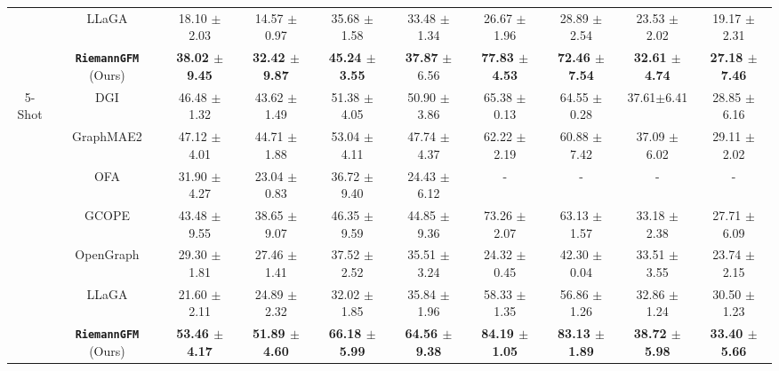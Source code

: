 \begin{table*}[ht]
\begin{tabular}{c  c |cc cc cc cc}
    & LLaGA \cite{icml24llaga}
    & 18.10 {\scriptsize$\pm$2.03} & 14.57 {\scriptsize$\pm$0.97} & 35.68 {\scriptsize$\pm$1.58} & 33.48 {\scriptsize$\pm$1.34} & 26.67 {\scriptsize$\pm$1.96} & 28.89 {\scriptsize$\pm$2.54} & 23.53 {\scriptsize$\pm$2.02} & 19.17 {\scriptsize$\pm$2.31} \\
    & \textbf{\texttt{RiemannGFM}}  (Ours)
    & \textbf{38.02 {\scriptsize$\pm$9.45}} & \textbf{32.42 {\scriptsize$\pm$9.87}} & \textbf{45.24 {\scriptsize$\pm$3.55} }& 
    \textbf{37.87} {\scriptsize$\pm$6.56} & \textbf{77.83 {\scriptsize$\pm$4.53}} & \textbf{72.46 {\scriptsize$\pm$7.54}} & \textbf{32.61 {\scriptsize$\pm$4.74}} & \textbf{27.18 {\scriptsize$\pm$7.46}} \\
    \hline
    \multirow{7}{*}{5-Shot}
    & DGI \cite{iclr19dgi}
    & 46.48 {\scriptsize$\pm$1.32} & 43.62 {\scriptsize$\pm$1.49} & 51.38 {\scriptsize$\pm$4.05} & 50.90 {\scriptsize$\pm$3.86} & 65.38 {\scriptsize$\pm$0.13} & 64.55 {\scriptsize$\pm$0.28} & 37.61{\scriptsize$\pm$6.41} & 28.85 {\scriptsize$\pm$6.16} \\
    & GraphMAE2 \cite{www23graphmae2}
    & 47.12 {\scriptsize$\pm$4.01} & 44.71 {\scriptsize$\pm$1.88} & 53.04 {\scriptsize$\pm$4.11} & 47.74 {\scriptsize$\pm$4.37} & 62.22 {\scriptsize$\pm$2.19} & 60.88 {\scriptsize$\pm$7.42} & 37.09 {\scriptsize$\pm$6.02} & 29.11 {\scriptsize$\pm$2.02} \\
    & OFA \cite{iclr24ofa}
    & 31.90 {\scriptsize$\pm$4.27} & 23.04 {\scriptsize$\pm$0.83} & 36.72 {\scriptsize$\pm$9.40} & 24.43 {\scriptsize$\pm$6.12} 
    &- &- & -& -\\
    & GCOPE \cite{kdd24gcope}
    & 43.48 {\scriptsize$\pm$9.55} & 38.65 {\scriptsize$\pm$9.07} & 46.35 {\scriptsize$\pm$9.59} & 44.85 {\scriptsize$\pm$9.36} & 73.26 {\scriptsize$\pm$2.07} & 63.13 {\scriptsize$\pm$1.57} & 33.18 {\scriptsize$\pm$2.38} & 27.71 {\scriptsize$\pm$6.09} \\
    & OpenGraph \cite{zhao2024graphany}
    & 29.30 {\scriptsize$\pm$1.81} & 27.46 {\scriptsize$\pm$1.41} & 37.52 {\scriptsize$\pm$2.52} & 35.51 {\scriptsize$\pm$3.24} & 24.32 {\scriptsize$\pm$0.45} & 42.30 {\scriptsize$\pm$0.04} & 33.51 {\scriptsize$\pm$3.55} & 23.74 {\scriptsize$\pm$2.15} \\
    & LLaGA \cite{icml24llaga}
    &21.60 {\scriptsize$\pm$2.11} & 24.89 {\scriptsize$\pm$2.32} &  32.02 {\scriptsize$\pm$1.85} &  {35.84 \scriptsize$\pm$1.96} & 58.33 {\scriptsize$\pm$1.35} & 56.86 {\scriptsize$\pm$1.26} & 32.86 {\scriptsize$\pm$1.24} & 30.50 {\scriptsize$\pm$1.23} \\
    & \textbf{\texttt{RiemannGFM}}  (Ours)
    &\textbf{53.46 {\scriptsize$\pm$4.17}} & \textbf{51.89 {\scriptsize$\pm$4.60}} &  \textbf{66.18 {\scriptsize$\pm$5.99} }&  \textbf{64.56 {\scriptsize$\pm$9.38} }& \textbf{84.19 {\scriptsize$\pm$1.05} }& \textbf{83.13 {\scriptsize$\pm$1.89} }& \textbf{38.72 {\scriptsize$\pm$5.98}} & \textbf{33.40 {\scriptsize$\pm$5.66} }\\
    \hline
    \end{tabular}
    \end{table*}





